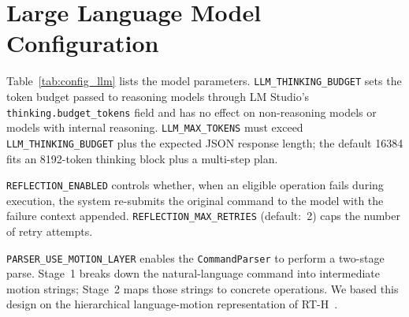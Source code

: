 \section{Large Language Model Configuration}\label{appendix:config:llm}
Table~\ref{tab:config_llm} lists the model parameters. \texttt{LLM\_THINKING\_BUDGET} sets the token budget passed to reasoning models through LM Studio's \texttt{thinking.budget\_tokens} field and has no effect on non-reasoning models or models with internal reasoning. \texttt{LLM\_MAX\_TOKENS} must exceed \texttt{LLM\_THINKING\_BUDGET} plus the expected JSON response length; the default 16384 fits an 8192-token thinking block plus a multi-step plan.

\texttt{REFLECTION\_ENABLED} controls whether, when an eligible operation fails during execution, the system re-submits the original command to the model with the failure context appended. \texttt{REFLECTION\_MAX\_RETRIES} (default:~2) caps the number of retry attempts.

\texttt{PARSER\_USE\_MOTION\_LAYER} enables the \texttt{CommandParser} to perform a two-stage parse. Stage~1 breaks down the natural-language command into intermediate motion strings; Stage~2 maps those strings to concrete operations. We based this design on the hierarchical language-motion representation of RT-H~\cite{belkhale2024rthactionhierarchiesusing}.

